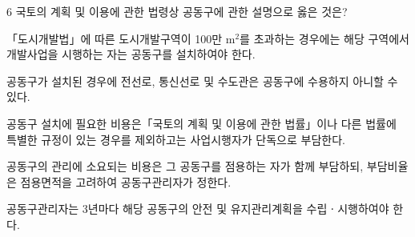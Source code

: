 \begin{question}{6}
국토의 계획 및 이용에 관한 법령상 공동구에 관한 설명으로 옳은 것은?
\begin{choices}
  \item 「도시개발법」에 따른 도시개발구역이 100만 $\mathrm{m}^2$를 초과하는 경우에는 해당 구역에서 개발사업을 시행하는 자는 공동구를 설치하여야 한다.
  \item 공동구가 설치된 경우에 전선로, 통신선로 및 수도관은 공동구에 수용하지 아니할 수 있다.
  \item 공동구 설치에 필요한 비용은「국토의 계획 및 이용에 관한 법률」이나 다른 법률에 특별한 규정이 있는 경우를 제외하고는 사업시행자가 단독으로 부담한다.
  \item 공동구의 관리에 소요되는 비용은 그 공동구를 점용하는 자가 함께 부담하되, 부담비율은 점용면적을 고려하여 공동구관리자가 정한다.
  \item 공동구관리자는 3년마다 해당 공동구의 안전 및 유지관리계획을 수립ㆍ시행하여야 한다.
\end{choices}
\end{question}
